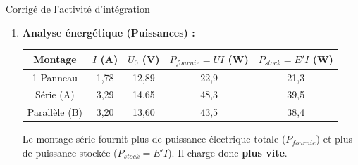 \documentclass[11pt]{article}
\newcommand{\cle}[1]{{\popxbold\color{popdark}#1}}
\begin{document}
\begin{exoresolu}{Corrigé de l'activité d'intégration}
\begin{enumerate}
    \item \textbf{Analyse énergétique (Puissances) :}
    \begin{center}
    \begin{tabular}{|c|c|c|c|c|}\hline
    \rowcolor{popblueL}
    Montage & \cle{$I$} (A) & \cle{$U_0$} (V) & \cle{$P_{fournie}=UI$} (W) & \cle{$P_{stock}=E'I$} (W) \\ \hline
    1 Panneau & 1,78 & 12,89 & 22,9 & 21,3 \\ \hline
    Série (A) & 3,29 & 14,65 & 48,3 & 39,5 \\ \hline
    Parallèle (B) & 3,20 & 13,60 & 43,5 & 38,4 \\ \hline
    \end{tabular}
    \end{center}
    Le montage série fournit plus de puissance électrique totale (\cle{$P_{fournie}$}) et plus de puissance stockée (\cle{$P_{stock} = E'I$}). Il charge donc \textbf{plus vite}.
    

\end{enumerate}
\end{exoresolu}
\end{document}
